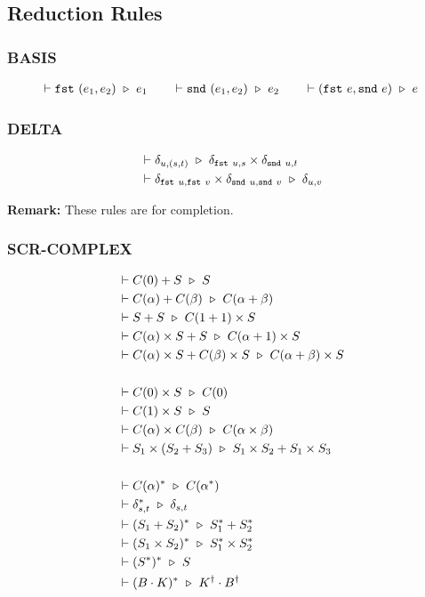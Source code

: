 \subsection{Reduction Rules}
\label{sec: typed_dirac_rules}
\subsubsection*{\textsf{BASIS}}
\begin{align*}
    \vdash \texttt{fst}\ (e_1, e_2) \ \triangleright\  e_1
    \qquad
    \vdash \texttt{snd}\ (e_1, e_2) \ \triangleright\  e_2
    \qquad
    \vdash (\texttt{fst}\ e, \texttt{snd}\ e)\ \triangleright\  e
\end{align*}

\subsubsection*{\textsf{DELTA}}
\begin{align*}
  & \vdash \delta_{u, (s, t)} \ \triangleright\  \delta_{\texttt{fst}\ u, s} \times \delta_{\texttt{snd}\ u, t} \\
  & \vdash \delta_{\texttt{fst}\ u, \texttt{fst}\ v}\times\delta_{\texttt{snd}\ u, \texttt{snd}\ v} \ \triangleright\  \delta_{u, v}
\end{align*}

\textbf{Remark: } These rules are for completion.


\subsubsection*{\textsf{SCR-COMPLEX}}
\begin{align*}
  & \vdash C(0) + S \ \triangleright\  S \\
  & \vdash C(\alpha) + C(\beta) \ \triangleright\  C(\alpha + \beta) \\
  & \vdash S + S \ \triangleright\  C(1 + 1) \times S \\
  & \vdash C(\alpha) \times S + S \ \triangleright\  C(\alpha + 1) \times S \\
  & \vdash C(\alpha) \times S + C(\beta) \times S \ \triangleright\  C(\alpha + \beta) \times S
  \\
  \\
  & \vdash C(0) \times S \ \triangleright\  C(0) \\
  & \vdash C(1) \times S \ \triangleright\  S \\
  & \vdash C(\alpha) \times C(\beta) \ \triangleright\  C(\alpha \times \beta) \\
  & \vdash S_1 \times (S_2 + S_3) \ \triangleright\  S_1 \times S_2 + S_1 \times S_3
  \\
  \\
  & \vdash C(\alpha)^* \ \triangleright\  C(\alpha^*) \\
  & \vdash \delta_{s, t}^* \ \triangleright\  \delta_{s, t} \\
  & \vdash (S_1 + S_2)^* \ \triangleright\  S_1^* + S_2^* \\
  & \vdash (S_1 \times S_2)^* \ \triangleright\  S_1^* \times S_2^* \\
  & \vdash (S^*)^* \ \triangleright\  S \\
  & \vdash (B \cdot K)^* \ \triangleright\  K^\dagger \cdot B^\dagger
\end{align*}

